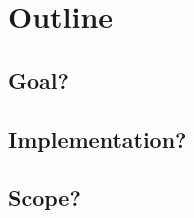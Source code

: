 \documentclass{article}
\begin{document}
\section{Outline}

\subsection{Goal?}
\subsection{Implementation?}
\subsection{Scope?}
\end{document}
